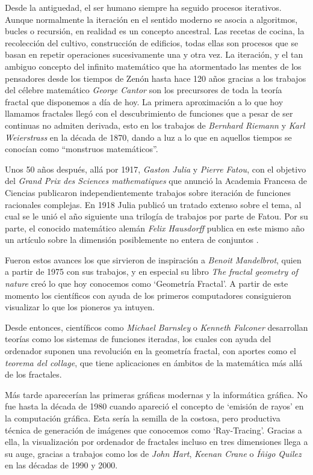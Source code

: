 
Desde la antiguedad, el ser humano siempre ha seguido procesos iterativos. Aunque normalmente la iteración en el sentido moderno se asocia a algoritmos, bucles o recursión, en realidad es un concepto ancestral. Las recetas de cocina, la recolección del cultivo, construcción de edificios, todas ellas son procesos que se basan en repetir operaciones sucesivamente una y otra vez. La iteración, y el tan ambiguo concepto del infinito matemático que ha atormentado las mentes de los pensadores desde los tiempos de Zenón hasta hace 120 años gracias a los trabajos del célebre matemático \textit{George Cantor} son los precursores de toda la teoría fractal que disponemos a día de hoy. La primera aproximación a lo que hoy llamamos fractales llegó con el descubrimiento de funciones que a pesar de ser continuas no admiten derivada, esto en los trabajos de \textit{Bernhard Riemann} y \textit{Karl Weierstrass} en la década de 1870, dando a luz a lo que en aquellos tiempos se conocían como ``monstruos matemáticos''.

Unos 50 años después, allá por 1917, \textit{Gaston Julia} y \textit{Pierre Fatou}, con el objetivo del \textit{Grand Prix des Sciences mathematiques} que anunció la Academia Francesa de Ciencias publicaron independientemente trabajos sobre iteración de funciones racionales complejas. En 1918 Julia publicó un tratado extenso sobre el tema, al cual se le unió el año siguiente una trilogía de trabajos por parte de Fatou. Por su parte, el conocido matemático alemán \textit{Felix Hausdorff} publica en este mismo año un artículo sobre la dimensión posiblemente no entera de conjuntos \cite{Hausdorff1919}. 

Fueron estos avances los que sirvieron de inspiración a \textit{Benoit Mandelbrot}, quien a partir de 1975 con sus trabajos, y en especial su libro \textit{The fractal geometry of nature} \cite{alma991007242979704990} creó lo que hoy conocemos como `Geometría Fractal'. A partir de este momento los científicos con ayuda de los primeros computadores consiguieron visualizar lo que los pioneros ya intuyen.

Desde entonces, científicos como \textit{Michael Barnsley} o \textit{Kenneth Falconer} desarrollan teorías como los sistemas de funciones iteradas, los cuales con ayuda del ordenador suponen una revolución en la geometría fractal, con aportes como el \textit{teorema del collage}, que tiene aplicaciones en ámbitos de la matemática más allá de los fractales. 

Más tarde aparecerían las primeras gráficas modernas y la informática gráfica. No fue hasta la década de 1980 cuando apareció el concepto de `emisión de rayos' en la computación gráfica. Esta sería la semilla de la costosa, pero productiva técnica de generación de imágenes que conocemos como `Ray-Tracing'. Gracias a ella, la visualización por ordenador de fractales incluso en tres dimensiones llega a su auge, gracias a trabajos como los de \textit{John Hart}, \textit{Keenan Crane} o \textit{Íñigo Quilez} en las décadas de 1990 y 2000.


